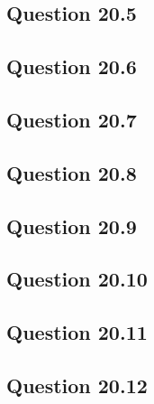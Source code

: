 \documentclass[14pt]{article}
\begin{document}
\subsection{Question 20.5}
\subsection{Question 20.6}
\subsection{Question 20.7}
\subsection{Question 20.8}
\subsection{Question 20.9}
\subsection{Question 20.10}
\subsection{Question 20.11}
\subsection{Question 20.12}



\newpage




\end{document}

